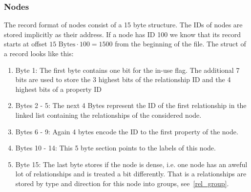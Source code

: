 \documentclass[a4paper,10pt]{article}
\begin{document}
        \subsubsection{Nodes}
            The record format of nodes consist of a 15 byte structure. The IDs of nodes are stored implicitly as their address. If a node has ID 100 we know that its record starts at offset $15 \text{ Bytes} \cdot 100 = 1500$ from the beginning of the file. The struct of a record looks like this:
            \begin{enumerate}
                \item Byte 1: The first byte contains one bit for the in-use flag. The additional 7 bits are used to store the 3 highest bits of the relationship ID and the 4 highest bits of a property ID
                \item Bytes 2 - 5: The next 4 Bytes represent the ID of the first relationship in the linked list containing the relationships of the considered node.
                \item Bytes 6 - 9: Again 4 bytes encode the ID to the first property of the node.
                \item Bytes 10 - 14: This 5 byte section points to the labels of this node.
                \item Byte 15: The last byte stores if the node is dense, i.e. one node has an aweful lot of relationships and is treated a bit differently. That is a relationships are stored by type and direction for this node into groups, see~\ref{rel_group}.
            \end{enumerate}
        
\end{document}

